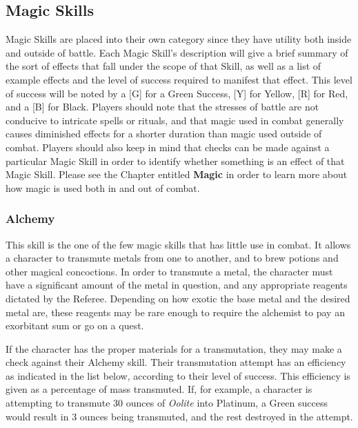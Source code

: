 \documentclass[oneside]{book}
\begin{document}
\begin{multicols}{2}
\section{Magic Skills}
Magic Skills are placed into their own category since they have utility both inside and outside of battle. Each Magic Skill's description will give a brief summary of the sort of effects that fall under the scope of that Skill, as well as a list of example effects and the level of success required to manifest that effect. This level of success will be noted by a [G] for a Green Success, [Y] for Yellow, [R] for Red, and a [B] for Black. Players should note that the stresses of battle are not conducive to intricate spells or rituals, and that magic used in combat generally causes diminished effects for a shorter duration than magic used outside of combat. Players should also keep in mind that checks can be made against a particular Magic Skill in order to identify whether something is an effect of that Magic Skill. Please see the Chapter entitled \textbf{Magic} in order to learn more about how magic is used both in and out of combat. 

\subsubsection{Alchemy}
This skill is the one of the few magic skills that has little use in combat. It allows a character to transmute metals from one to another, and to brew potions and other magical concoctions. In order to transmute a metal, the character must have a significant amount of the metal in question, and any appropriate reagents dictated by the Referee. Depending on how exotic the base metal and the desired metal are, these reagents may be rare enough to require the alchemist to pay an exorbitant sum or go on a quest.

If the character has the proper materials for a transmutation, they may make a check against their Alchemy skill. Their transmutation attempt has an efficiency as indicated in the list below, according to their level of success. This efficiency is given as a percentage of mass transmuted. If, for example, a character is attempting to transmute 30 ounces of \emph{Oolite} into Platinum, a Green success would result in 3 ounces being transmuted, and the rest destroyed in the attempt. 


\end{multicols}
\end{document}
